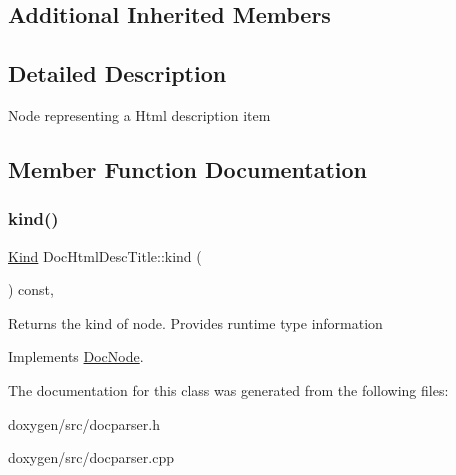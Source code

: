 \subsection*{Additional Inherited Members}


\subsection{Detailed Description}
Node representing a Html description item 

\subsection{Member Function Documentation}
\mbox{\label{class_doc_html_desc_title_add69ecdc619a8268bb8a7fa1a630f0dd}} 
\subsubsection{\texorpdfstring{kind()}{kind()}}
{\footnotesize\ttfamily \mbox{\hyperlink{class_doc_node_aebd16e89ca590d84cbd40543ea5faadb}{Kind}} Doc\+Html\+Desc\+Title\+::kind (\begin{DoxyParamCaption}{ }\end{DoxyParamCaption}) const\hspace{0.3cm}{\ttfamily [inline]}, {\ttfamily [virtual]}}

Returns the kind of node. Provides runtime type information 

Implements \mbox{\hyperlink{class_doc_node_a108ffd214a72ba6e93dac084a8f58049}{Doc\+Node}}.



The documentation for this class was generated from the following files\+:\begin{DoxyCompactItemize}
\item 
doxygen/src/docparser.\+h\item 
doxygen/src/docparser.\+cpp\end{DoxyCompactItemize}
